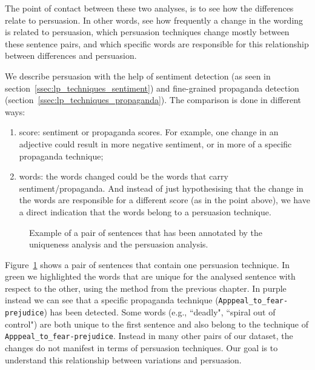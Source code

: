 The point of contact between these two analyses, is to see how the differences relate to persuasion. In other words, see how frequently a change in the wording is related to persuasion, which persuasion techniques change mostly between these sentence pairs, and which specific words are responsible for this relationship between differences and persuasion.

We describe persuasion with the help of sentiment detection (as seen in section~\ref{ssec:lp_techniques_sentiment}) and fine-grained propaganda detection (section~\ref{ssec:lp_techniques_propaganda}).
The comparison is done in different ways:
\begin{enumerate}
    \item score: sentiment or propaganda scores. For example, one change in an adjective could result in more negative sentiment, or in more of a specific propaganda technique;
    \item words: the words changed could be the words that carry sentiment/propaganda. And instead of just hypothesising that the change in the words are responsible for a different score (as in the point above), we have a direct indication that the words belong to a persuasion technique.
\end{enumerate}

\begin{figure}[!htbp]
    \centering
    \caption{Example of a pair of sentences that has been annotated by the uniqueness analysis and the persuasion analysis.}
    \label{fig:annotated_clique_data}
\end{figure}

Figure~\ref{fig:annotated_clique_data} shows a pair of sentences that contain one persuasion technique.
In green we highlighted the words that are unique for the analysed sentence with respect to the other, using the method from the previous chapter.
In purple instead we can see that a specific propaganda technique (\texttt{Apppeal\_to\_fear-prejudice}) has been detected.
Some words (e.g., ``deadly", ``spiral out of control") are both unique to the first sentence and also belong to the technique of \texttt{Apppeal\_to\_fear-prejudice}. Instead in many other pairs of our dataset, the changes do not manifest in terms of persuasion techniques.
Our goal is to understand this relationship between variations and persuasion.

